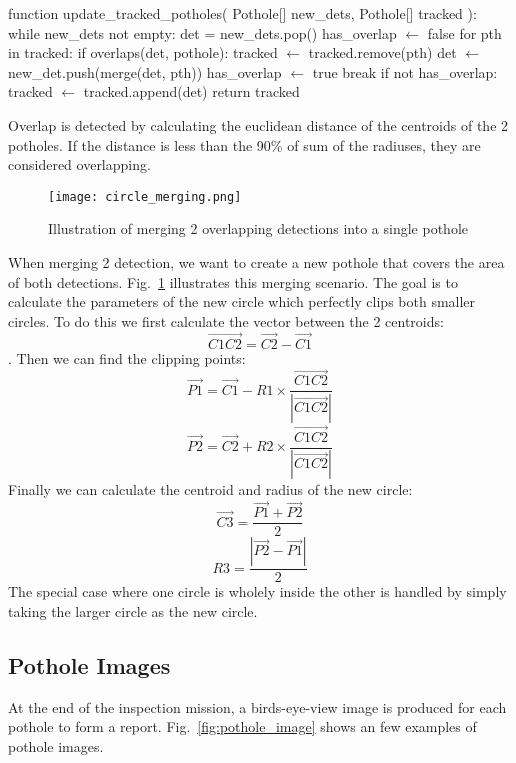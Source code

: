 \documentclass[conference]{IEEEtran}
\begin{document}
\begin{algorithm}[caption={Merge New Detection with Tracked Potholes}, label={alg1}]
function update_tracked_potholes(
    Pothole[] new_dets,
    Pothole[] tracked
):
    while new_dets not empty:
        det = new_dets.pop()
        has_overlap $\gets$ false
        for pth in tracked:
            if overlaps(det, pothole):
                tracked $\gets$ tracked.remove(pth)
                det $\gets$ new_det.push(merge(det, pth))
                has_overlap $\gets$ true
                break
        if not has_overlap:
            tracked $\gets$ tracked.append(det)
    return tracked
\end{algorithm}

Overlap is detected by calculating the euclidean distance of the centroids of the 2 potholes. If the distance is less than the 90\% of sum of the radiuses, they are considered overlapping.

\begin{figure}
    \centering
    \texttt{[image: circle\_merging.png]}
    \caption{Illustration of merging 2 overlapping detections into a single pothole}
    \label{fig:merging}
\end{figure}

When merging 2 detection, we want to create a new pothole that covers the area of both detections. Fig.~\ref{fig:merging} illustrates this merging scenario. The goal is to calculate the parameters of the new circle which perfectly clips both smaller circles. To do this we first calculate the vector between the 2 centroids:
 \[\overrightarrow{C1C2} = \overrightarrow{C2} - \overrightarrow{C1}\].
Then we can find the clipping points:
\[\overrightarrow{P1} = \overrightarrow{C1} -  R1 \times \frac{\overrightarrow{C1C2}}{|\overrightarrow{C1C2}|}\]
\[\overrightarrow{P2} = \overrightarrow{C2} + R2 \times \frac{\overrightarrow{C1C2}}{|\overrightarrow{C1C2}|}\]
Finally we can calculate the centroid and radius of the new circle:
\[\overrightarrow{C3} = \frac{\overrightarrow{P1} + \overrightarrow{P2}}{2}\]
\[R3 = \frac{|\overrightarrow{P2} - \overrightarrow{P1}|}{2}\]
The special case where one circle is wholely inside the other is handled by simply taking the larger circle as the new circle.

\subsection{Pothole Images}

At the end of the inspection mission, a birds-eye-view image is produced for each pothole to form a report. Fig.~\ref{fig:pothole_image} shows an few examples of pothole images.
\end{document}
